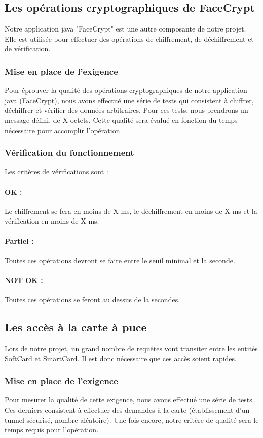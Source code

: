 \documentclass[a4paper,11pt,french]{article}
\begin{document}
\subsection{Les opérations cryptographiques de FaceCrypt}
	Notre application java "FaceCrypt" est une autre composante de notre
projet. Elle est utilisée pour effectuer des opérations de chiffrement, de
déchiffrement et de vérification.
\subsubsection{Mise en place de l'exigence}
	Pour éprouver la qualité des opérations cryptographiques de notre
application java (FaceCrypt), nous avons effectué une série de tests qui
consistent à chiffrer, déchiffrer et vérifier des données arbitraires. Pour
ces tests, nous prendrons un message défini, de X octets. Cette qualité sera
évalué en fonction du temps nécessaire pour accomplir l'opération.

\subsubsection{Vérification du fonctionnement}
	Les critères de vérifications sont :
\paragraph{OK : } Le chiffrement se fera en moins de X ms, le déchiffrement
en moins de X ms et la vérification en moins de X ms.
\paragraph{Partiel : } Toutes ces opérations devront se faire entre le seuil
minimal et la seconde.
\paragraph{NOT OK : } Toutes ces opérations se feront au dessus de la
secondes.



\subsection{Les accès à la carte à puce}
	Lors de notre projet, un grand nombre de requêtes vont transiter
entre les entités SoftCard et SmartCard. Il est donc nécessaire que ces
accès soient rapides.
\subsubsection{Mise en place de l'exigence}
	Pour mesurer la qualité de cette exigence, nous avons effectué une
série de tests. Ces derniers consistent à effectuer des demandes à la carte
(établissement d'un tunnel sécurisé, nombre aléatoire). Une fois encore,
notre critère de qualité sera le temps requis pour l'opération.
\end{document}
